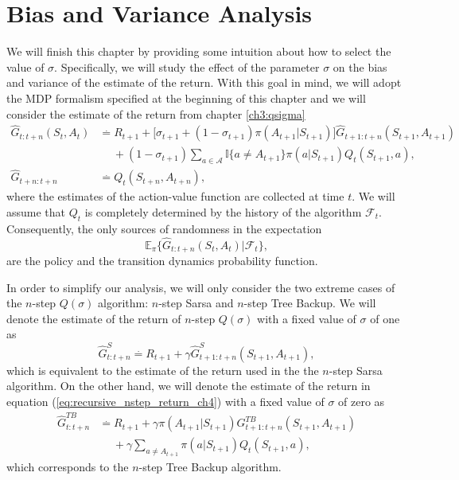 
\section{Bias and Variance Analysis}

We will finish this chapter by providing some intuition about how to select the value of $\sigma$.
Specifically, we will study the effect of the parameter $\sigma$ on the bias and variance of the estimate of the return.
With this goal in mind, we will adopt the MDP formalism specified at the beginning of this chapter and we will consider the estimate of the return from chapter \ref{ch3:qsigma}
%
\begin{align}
\label{eq:recursive_nstep_return_ch4}
\hat{G}_{t:t+n}(S_t, A_t) &\overset{.}{=} R_{t+1} + \big[ \sigma_{t+1} + (1-\sigma_{t+1})\pi(A_{t+1}|S_{t+1}) \big]
	\hat{G}_{t+1:t+n}(S_{t+1}, A_{t+1}) \nonumber \\
&\hspace{15pt}
	+ (1-\sigma_{t+1}) \sum_{a \in \mathcal{A}} \mathbb{I}\{ a \neq A_{t+1} \} \pi(a|S_{t+1}) 
	Q_{t}(S_{t+1}, a),
	\nonumber \\
\hat{G}_{t+n:t+n} &\overset{.}{=} Q_{t}(S_{t+n}, A_{t+n}),
\end{align}
%
where the estimates of the action-value function are collected at time $t$.
We will assume that $Q_t$ is completely determined by the history of the algorithm $\mathcal{F}_t$.
Consequently, the only sources of randomness in the expectation 
%
\begin{equation}
\label{eq:expected_onpolicy_return}
    \mathbb{E}_\pi \{ \hat{G}_{t:t+n} (S_t, A_t) | \mathcal{F}_t \},
\end{equation}
are the policy and the transition dynamics probability function.

In order to simplify our analysis, we will only consider the two extreme cases of the $n$-step $Q(\sigma)$ algorithm: $n$-step Sarsa and $n$-step Tree Backup.
We will denote the estimate of the return of $n$-step $Q(\sigma)$ with a fixed value of $\sigma$ of one as
\begin{equation}
\label{eq:nstep_sarsa_return}
    \hat{G}^{S}_{t:t+n} \overset{.}{=} R_{t+1} + \gamma \hat{G}^S_{t+1:t+n}(S_{t+1}, A_{t+1}),
\end{equation}
%
which is equivalent to the estimate of the return used in the the $n$-step Sarsa algorithm. 
On the other hand, we will denote the estimate of the return in equation (\ref{eq:recursive_nstep_return_ch4}) with a fixed value of $\sigma$ of zero as
\begin{align}
\label{eq:trebackup_return}
    \hat{G}^{TB}_{t:t+n} &\overset{.}{=} R_{t+1} + \gamma \pi(A_{t+1}|S_{t+1}) G^{TB}_{t+1:t+n}(S_{t+1}, A_{t+1}) 
    \nonumber \\
    & \hspace{15pt}
        + \gamma \sum_{a \neq A_{t+1}} \pi(a|S_{t+1}) Q_{t}(S_{t+1},a),
\end{align}
%
which corresponds to the $n$-step Tree Backup algorithm.

